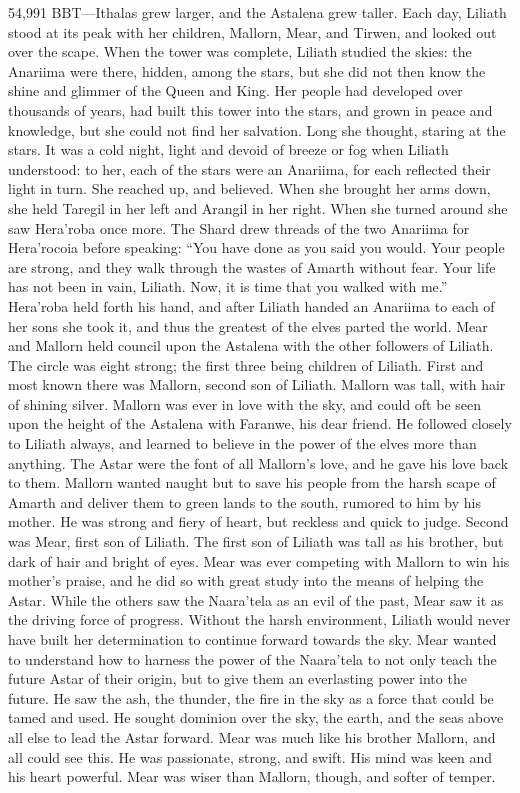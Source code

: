 \documentclass[smalldemyvopaper,11pt,twoside,onecolumn,openright,extrafontsizes]{memoir}
\begin{document}
{{54,991 BBT—Ithalas grew larger, and the Astalena grew taller. Each day, Liliath stood at its peak with her children, Mallorn, Mear, and Tirwen, and looked out over the scape. When the tower was complete, Liliath studied the skies: the Anariima were there, hidden, among the stars, but she did not then know the shine and glimmer of the Queen and King. Her people had developed over thousands of years, had built this tower into the stars, and grown in peace and knowledge, but she could not find her salvation. Long she thought, staring at the stars. It was a cold night, light and devoid of breeze or fog when Liliath understood: to her, each of the stars were an Anariima, for each reflected their light in turn. She reached up, and believed. When she brought her arms down, she held Taregil in her left and Arangil in her right. When she turned around she saw Hera’roba once more. The Shard drew threads of the two Anariima for Hera’rocoia before speaking: “You have done as you said you would. Your people are strong, and they walk through the wastes of Amarth without fear. Your life has not been in vain, Liliath. Now, it is time that you walked with me.” Hera’roba held forth his hand, and after Liliath handed an Anariima to each of her sons she took it, and thus the greatest of the elves parted the world. Mear and Mallorn held council upon the Astalena with the other followers of Liliath. The circle was eight strong; the first three being children of Liliath.
First and most known there was Mallorn, second son of Liliath. Mallorn was tall, with hair of shining silver. Mallorn was ever in love with the sky, and could oft be seen upon the height of the Astalena with Faranwe, his dear friend. He followed closely to Liliath always, and learned to believe in the power of the elves more than anything. The Astar were the font of all Mallorn’s love, and he gave his love back to them. Mallorn wanted naught but to save his people from the harsh scape of Amarth and deliver them to green lands to the south, rumored to him by his mother. He was strong and fiery of heart, but reckless and quick to judge.
Second was Mear, first son of Liliath. The first son of Liliath was tall as his brother, but dark of hair and bright of eyes. Mear was ever competing with Mallorn to win his mother’s praise, and he did so with great study into the means of helping the Astar. While the others saw the Naara’tela as an evil of the past, Mear saw it as the driving force of progress. Without the harsh environment, Liliath would never have built her determination to continue forward towards the sky. Mear wanted to understand how to harness the power of the Naara’tela to not only teach the future Astar of their origin, but to give them an everlasting power into the future. He saw the ash, the thunder, the fire in the sky as a force that could be tamed and used. He sought dominion over the sky, the earth, and the seas above all else to lead the Astar forward. Mear was much like his brother Mallorn, and all could see this. He was passionate, strong, and swift. His mind was keen and his heart powerful. Mear was wiser than Mallorn, though, and softer of temper.
}}
\end{document}
